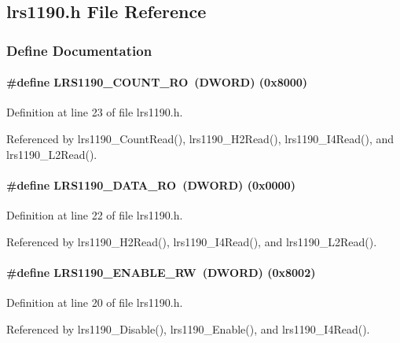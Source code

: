 \subsection{lrs1190.h File Reference}
\label{lrs1190_8h}


\subsubsection{Define Documentation}
\paragraph[{LRS1190\_\-COUNT\_\-RO}]{\setlength{\rightskip}{0pt plus 5cm}\#define LRS1190\_\-COUNT\_\-RO~({\bf DWORD}) (0x8000)}\hfill\label{lrs1190_8h_a2fb98183b20e0fa787bd8bd5bb2ee5ce}


Definition at line 23 of file lrs1190.h.

Referenced by lrs1190\_\-CountRead(), lrs1190\_\-H2Read(), lrs1190\_\-I4Read(), and lrs1190\_\-L2Read().
\paragraph[{LRS1190\_\-DATA\_\-RO}]{\setlength{\rightskip}{0pt plus 5cm}\#define LRS1190\_\-DATA\_\-RO~({\bf DWORD}) (0x0000)}\hfill\label{lrs1190_8h_a03f0724b949ea57c7ec34ab160eb7f51}


Definition at line 22 of file lrs1190.h.

Referenced by lrs1190\_\-H2Read(), lrs1190\_\-I4Read(), and lrs1190\_\-L2Read().
\paragraph[{LRS1190\_\-ENABLE\_\-RW}]{\setlength{\rightskip}{0pt plus 5cm}\#define LRS1190\_\-ENABLE\_\-RW~({\bf DWORD}) (0x8002)}\hfill\label{lrs1190_8h_ac1a8b13f03c953532adc47be3fb288e4}


Definition at line 20 of file lrs1190.h.

Referenced by lrs1190\_\-Disable(), lrs1190\_\-Enable(), and lrs1190\_\-I4Read().
